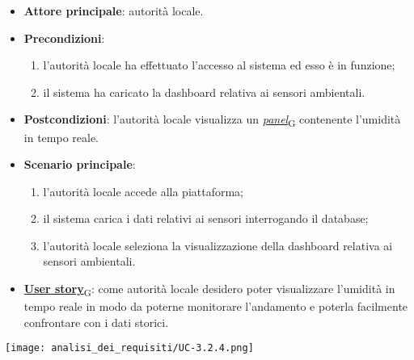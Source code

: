 \begin{itemize}
	\item \textbf{Attore principale}: autorità locale.
	\item \textbf{Precondizioni}:
	      \begin{enumerate}
		      \item l'autorità locale ha effettuato l'accesso al sistema ed esso è in funzione;
		      \item il sistema ha caricato la dashboard relativa ai sensori ambientali.
	      \end{enumerate}
	\item \textbf{Postcondizioni}: l'autorità locale visualizza un \href{https://7last.github.io/docs/pb/documentazione-interna/glossario\#panel}{\textit{panel}\textsubscript{G}} contenente l'umidità in tempo reale.
	\item \textbf{Scenario principale}:
	      \begin{enumerate}
		      \item l'autorità locale accede alla piattaforma;
		      \item il sistema carica i dati relativi ai sensori interrogando il database;
		      \item l'autorità locale seleziona la visualizzazione della dashboard relativa ai sensori ambientali.
	      \end{enumerate}
	\item \href{https://7last.github.io/docs/pb/documentazione-interna/glossario\#user-story}{\textbf{User story}\textsubscript{G}}:
	      come autorità locale desidero poter visualizzare l'umidità in tempo reale in modo da poterne monitorare l'andamento
	      e poterla facilmente confrontare con i dati storici.
\end{itemize}
\begin{center}
	\texttt{[image: analisi\_dei\_requisiti/UC-3.2.4.png]}
\end{center}


